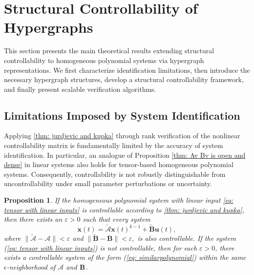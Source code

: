 \documentclass[journal,twoside,web]{ieeecolor}
\newtheorem{proposition}{Proposition}
\begin{document}
\section{Structural Controllability of Hypergraphs}\label{sec:3}


This section presents the main theoretical results extending structural controllability to homogeneous polynomial systems via hypergraph representations.
%
We first characterize identification limitations, then introduce the necessary hypergraph structures, develop a structural controllability framework, and finally present scalable verification algorithms.



\subsection{Limitations Imposed by System Identification}\label{sec: 3a}
Applying \cref{thm: jurdjevic and kupka} through rank verification of the nonlinear controllability matrix is fundamentally limited by the accuracy of system identification. In particular, an analogue of Proposition \ref{thm: Av Bv is open and dense} in linear systems also holds for tensor-based homogeneous polynomial systems. Consequently, controllability is not robustly distinguishable from uncontrollability under small parameter perturbations or uncertainty.
\begin{proposition}\label{thm: At Bv is open and dense}
    If the homogeneous polynomial system with linear input \eqref{eq: tensor with linear inputs} is controllable according to \cref{thm: jurdjevic and kupka}, then there exists an $\varepsilon>0$ such that every system
    \begin{equation}  \label{eq: similarpolynomial}     
         \dot{\textbf{x}}(t)=\tilde{\mathscr{A}}\textbf{x}(t)^{k-1}+\tilde{\textbf{B}}\textbf{u}(t),
    \end{equation}
    where $\|\tilde{\mathscr{A}}-\mathscr{A}\|<\varepsilon$ and $\|\tilde{\textbf{B}}-\textbf{B}\|<\varepsilon,$
    is also controllable. If the  system (\ref{eq: tensor with linear inputs}) is not controllable, then for each $\varepsilon>0$, there exists a controllable system of the form (\ref{eq: similarpolynomial}) within the same $\epsilon$-neighborhood of $\mathscr A$ and $\textbf B$.
\end{proposition}
\end{document}
